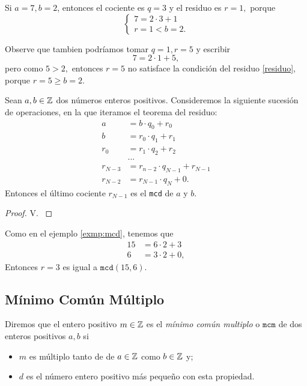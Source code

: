 	\begin{problema}
		Si $a=7,b=2$, entonces el cociente es $q=3$ y el residuo es $r=1,$ porque
		$$\begin{cases}
			7=2\cdot 3+1\\ {r=1}<{b=2}.     
		\end{cases}
		$$
	\end{problema}

		Observe que tambien podr\'iamos tomar $q=1, r=5$ y escribir $$7=2\cdot 1+5,$$ pero como ${5}>{2},$ entonces $r=5$ no 
		satisface la condici\'on del residuo \eqref{residuo}, porque ${r=5}\geq {b=2}.$

	\begin{alg}
		Sean $a,b\in \mathbb{Z}$ dos números enteros positivos. Consideremos la siguiente sucesi\'on de operaciones, en la que iteramos el teorema del residuo:
		\begin{align*}
			a&=b\cdot q_{0}+r_{0} \\
			b&=r_{0}\cdot q_{1}+r_{1}\\
			r_{0}&=r_{1}\cdot q_{2}+r_{2}\\
			&...\\
			r_{N-3}&=r_{n-2}\cdot q_{N-1}+r_{N-1}\\
			r_{N-2}&=r_{N-1}\cdot q_{N}+0.
		\end{align*}
		Entonces el último cociente $r_{N-1}$ es el \texttt{mcd} de $a$ y $b.$
	\end{alg}
	
	\begin{proof}
		V. \cite[sección 7.4, prop. 1]{cardenas1973algebra}
	\end{proof}
	
	Como en el ejemplo \ref{exmp:mcd}, tenemos que 
	\begin{align*}
		15&=6\cdot 2+3\\ 
		6&=3\cdot 2+0, 
	\end{align*}
	Entonces $r=3$ es igual a $\texttt{mcd}(15,6)$.



\subsection{M\'inimo Común Múltiplo}


	\begin{defn}
		\label{mcm} 
		Diremos que el entero positivo $m\in \mathbb{Z}$ es el \emph{m\'inimo común multiplo} o $\texttt{mcm}$ de dos enteros positivos $a,b$ si
		\begin{itemize}
			\item $m$ es múltiplo tanto de de $a\in \mathbb{Z}$ como $b\in \mathbb{Z}$ y;
			\item $d$ es el número entero positivo más pequeño con esta propiedad.
		\end{itemize}		
	\end{defn}
	
